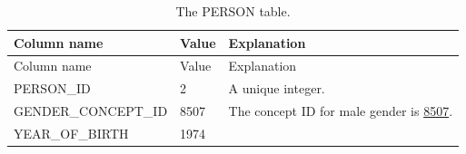 \documentclass[11pt]{book}
\theoremstyle{definition}
\theoremstyle{definition}
\theoremstyle{definition}
\theoremstyle{remark}
\begin{document}
\begin{longtable}[]{@{}lll@{}}
\caption{\label{tab:johnPerson} The PERSON table.}\tabularnewline
\toprule
\begin{minipage}[b]{0.28\columnwidth}\raggedright
Column name\strut
\end{minipage} & \begin{minipage}[b]{0.15\columnwidth}\raggedright
Value\strut
\end{minipage} & \begin{minipage}[b]{0.49\columnwidth}\raggedright
Explanation\strut
\end{minipage}\tabularnewline
\midrule
\endfirsthead
\toprule
\begin{minipage}[b]{0.28\columnwidth}\raggedright
Column name\strut
\end{minipage} & \begin{minipage}[b]{0.15\columnwidth}\raggedright
Value\strut
\end{minipage} & \begin{minipage}[b]{0.49\columnwidth}\raggedright
Explanation\strut
\end{minipage}\tabularnewline
\midrule
\endhead
\begin{minipage}[t]{0.28\columnwidth}\raggedright
PERSON\_ID\strut
\end{minipage} & \begin{minipage}[t]{0.15\columnwidth}\raggedright
2\strut
\end{minipage} & \begin{minipage}[t]{0.49\columnwidth}\raggedright
A unique integer.\strut
\end{minipage}\tabularnewline
\begin{minipage}[t]{0.28\columnwidth}\raggedright
GENDER\_CONCEPT\_ID\strut
\end{minipage} & \begin{minipage}[t]{0.15\columnwidth}\raggedright
8507\strut
\end{minipage} & \begin{minipage}[t]{0.49\columnwidth}\raggedright
The concept ID for male gender is \href{http://athena.ohdsi.org/search-terms/terms/8507}{8507}.\strut
\end{minipage}\tabularnewline
\begin{minipage}[t]{0.28\columnwidth}\raggedright
YEAR\_OF\_BIRTH\strut
\end{minipage} & \begin{minipage}[t]{0.15\columnwidth}\raggedright
1974\strut
\end{minipage} & \begin{minipage}[t]{0.49\columnwidth}\raggedright

\end{minipage}
\end{longtable}
\end{document}
